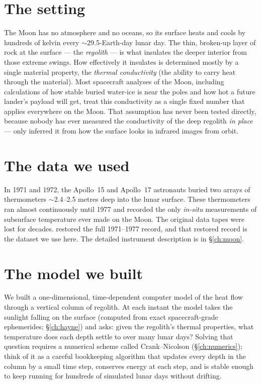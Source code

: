 \documentclass[11pt]{report}
\begin{document}
\section{The setting}

The Moon has no atmosphere and no oceans, so its surface heats and
cools by hundreds of kelvin every $\sim$29.5-Earth-day lunar day.
The thin, broken-up layer of rock at the surface --- the
\emph{regolith} --- is what insulates the deeper interior from those
extreme swings. How effectively it insulates is determined mostly
by a single material property, the \emph{thermal conductivity} (the
ability to carry heat through the material). Most spacecraft analyses
of the Moon, including calculations of how stable buried water-ice is
near the poles and how hot a future lander's payload will get, treat
this conductivity as a single fixed number that applies everywhere on
the Moon. That assumption has never been tested directly, because
nobody has ever measured the conductivity of the deep regolith
\emph{in place} --- only inferred it from how the surface looks in
infrared images from orbit.

\section{The data we used}

In 1971 and 1972, the Apollo~15 and Apollo~17 astronauts buried two
arrays of thermometers $\sim$2.4--2.5 metres deep into the lunar
surface. These thermometers ran almost continuously until 1977 and
recorded the only \emph{in-situ} measurements of subsurface
temperature ever made on the Moon. The original data tapes were lost
for decades. \citet{nagihara2018} restored the full
1971--1977 record, and that restored record is the dataset we use
here. The detailed instrument description is in \S\ref{ch:moon}.

\section{The model we built}

We built a one-dimensional, time-dependent computer model of the
heat flow through a vertical column of regolith. At each instant
the model takes the sunlight falling on the surface (computed from
exact spacecraft-grade ephemerides; \S\ref{ch:hayne}) and asks: given
the regolith's thermal properties, what temperature does each depth
settle to over many lunar days? Solving that question requires a
numerical scheme called Crank--Nicolson (\S\ref{ch:numerics}); think
of it as a careful bookkeeping algorithm that updates every depth in
the column by a small time step, conserves energy at each step, and
is stable enough to keep running for hundreds of simulated lunar days
without drifting.
\end{document}

